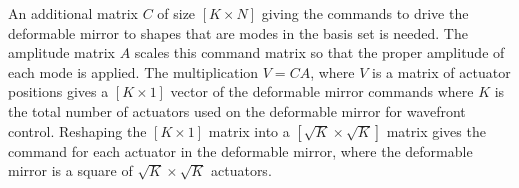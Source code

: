 An additional matrix $C$ of size $[K\times N]$ giving the commands to drive the deformable mirror to shapes that are modes in the basis set is needed. The amplitude matrix $A$ scales this command matrix so that the proper amplitude of each mode is applied. The multiplication $V=CA$, where $V$ is a matrix of actuator positions gives a $[K\times 1]$ vector of the deformable mirror commands where $K$ is the total number of actuators used on the deformable mirror for wavefront control.  Reshaping the $[K\times 1]$ matrix into a $[\sqrt{K}\times \sqrt{K}]$ matrix gives the command for each actuator in the deformable mirror, where the deformable mirror is a square of $\sqrt{K}\times \sqrt{K}$ actuators.